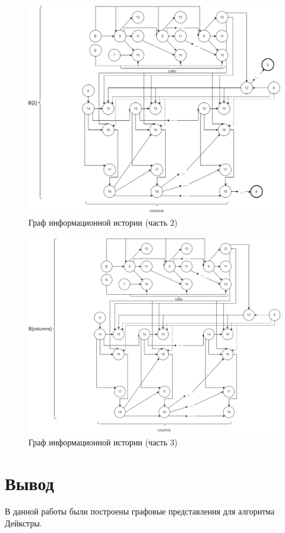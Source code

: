 \documentclass[a4paper,14pt, unknownkeysallowed]{extreport}
\begin{document}
\begin{figure}[h!]
	\centering
	\includegraphics[width=1\linewidth]{img/info_hist2.png}
	\caption{Граф информационной истории (часть 2)}
	\label{fig:info_hist2}
\end{figure}

\begin{figure}[h!]
	\centering
	\includegraphics[width=1\linewidth]{img/info_hist3.png}
	\caption{Граф информационной истории (часть 3)}
	\label{fig:info_hist3}
\end{figure}

\chapter{Вывод}
В данной работы были построены графовые представления для алгоритма Дейкстры.
 
\end{document}
